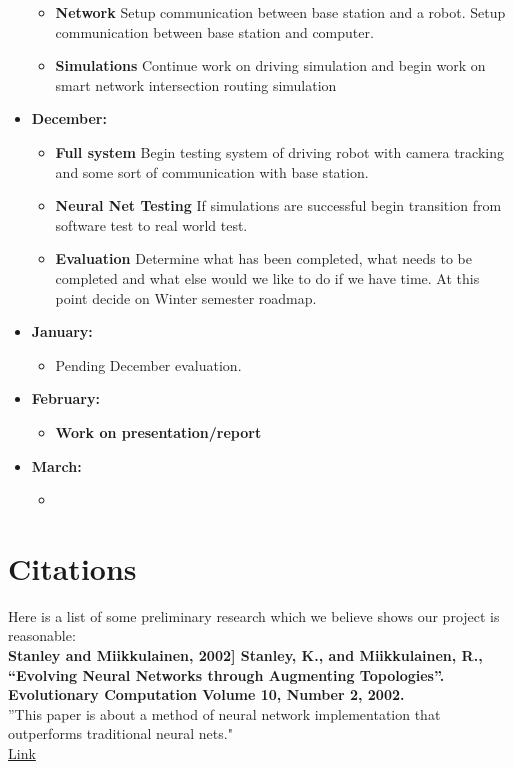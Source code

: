 \documentclass[a4paper]{article}
\begin{document}
\begin{itemize}
\begin{itemize}
				\item \textbf{Network} Setup communication between base station and a robot. Setup communication between base station and computer.
				\item \textbf{Simulations} Continue work on driving simulation and begin work on smart network intersection routing simulation
			\end{itemize}
		\item \textbf{December:}
			\begin{itemize}
				\item \textbf{Full system} Begin testing system of driving robot with camera tracking and some sort of communication with base station.
				\item \textbf{Neural Net Testing} If simulations are successful begin transition from software test to real world test.
				\item \textbf{Evaluation} Determine what has been completed, what needs to be completed and what else would we like to do if we have time. At this point decide on Winter semester roadmap.
			\end{itemize}
		\item \textbf{January:}
			\begin{itemize}
				\item Pending December evaluation.
			\end{itemize}
		\item \textbf{February:}
			\begin{itemize}
				\item \textbf{Work on presentation/report}
			\end{itemize}
		\item \textbf{March:}
			\begin{itemize}
				\item 
			\end{itemize}
	\end{itemize}
	\section*{Citations}
	Here is a list of some preliminary research which we believe shows our project is reasonable:\\
	
	\textbf{Stanley and Miikkulainen, 2002] Stanley, K., and Miikkulainen, R., “Evolving Neural Networks through Augmenting Topologies”. Evolutionary Computation Volume 10, Number 2, 2002.}\\
	”This paper is about a method of neural network implementation that outperforms traditional neural nets."\\ 
	\href{http://nn.cs.utexas.edu/downloads/papers/stanley.ec02.pdf}{Link}\\
		
\end{document}
